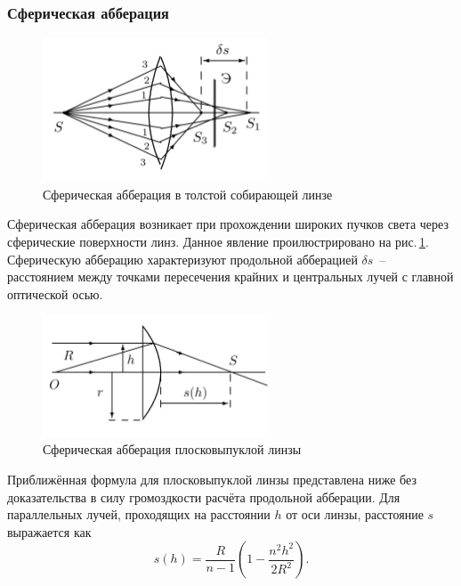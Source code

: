 \documentclass[a4paper,12pt]{article} %
\begin{document}
\subsubsection{Сферическая абберация}

\begin{figure}[h]
    \centering
    \includegraphics[width=0.6\textwidth]{spherAbberation.png}
    \caption{Сферическая абберация в толстой собирающей линзе}
    \label{fig:spherAbberation}
\end{figure}

Сферическая абберация возникает при прохождении широких пучков света через сферические поверхности линз. Данное явление проилюстрировано на рис.\,\ref{fig:spherAbberation}. Сферическую абберацию характеризуют продольной абберацией $\delta s$~-- расстоянием между точками пересечения крайних и центральных лучей с главной оптической осью.

\begin{figure}[h]
    \centering
    \includegraphics[width=0.6\textwidth]{planoConvexLens.png}
    \caption{Сферическая абберация плосковыпуклой линзы}
    \label{fig:planoConvex}
\end{figure}

Приближённая формула для плосковыпуклой линзы представлена ниже без доказательства в силу громоздкости расчёта продольной абберации. Для параллельных лучей, проходящих на расстоянии $h$ от оси линзы, расстояние $s$ выражается как
\begin{equation}
    s(h) = \frac{R}{n-1}\left(1 - \frac{n^2h^2}{2R^2}\right).
\end{equation}
\end{document}
